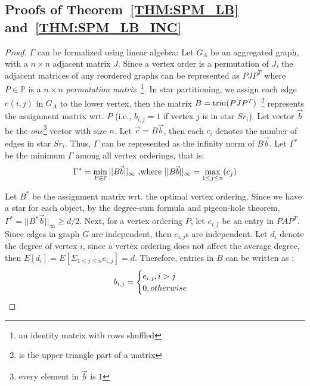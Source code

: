 \subsection{Proofs of Theorem~\ref{THM:SPM_LB} and~\ref{THM:SPM_LB_INC}}
\label{apx:thm2proof}

\begin{proof}
$\Gamma$ can be formalized using linear algebra:
Let $G_A$ be an aggregated graph, with a $n \times n$ adjacent matrix $J$.
Since a vertex order is a permutation of $J$, the adjacent matrices 
of any reordered graphs can be represented as $PJP^T$
where $P \in \mathbb{P}$ is a $n\times n$ \emph{permutation matrix}~\footnote{an identity matrix with rows shuffled}.
In star partitioning, we assign each edge $e(i,j)$ in $G_A$ to the lower vertex, 
then the matrix $B=\operatorname*{triu}(PJP^T)$~\footnote{ is the upper triangle part of a matrix}
represents the assignment matrix wrt. $P$ (i.e., $b_{i,j} = 1$ if vertex $j$ is in star $Sr_i$).
Let vector $\vec{b}$ be the \textit{one}\footnote{every element in $\vec{b}$ is $1$} 
vector with size $n$. Let $\vec{c} = B\vec{b}$, then each $c_i$ 
denotes the number of edges in star $Sr_i$. Thus, $\Gamma$ can be represented
as the infinity norm of $B\vec{b}$. Let $\Gamma^*$ be the minimum $\Gamma$ among all vertex orderings, that is:
\vspace{-2mm}
\begin{equation}
\vspace{-2mm}
\Gamma^* = \min_{P \in \mathbb{P}}{||B\vec{b}||_\infty} \text{ ,where } ||B\vec{b}||_\infty = \max_{1\leq j \leq n}(c_j)
\end{equation}

Let $B^*$ be the assignment matrix wrt. the optimal vertex ordering.
Since we have a star for each object, by the degree-sum formula and pigeon-hole theorem, 
$\Gamma^*=||B^*\vec{b}||_\infty \geq d/2$.
Next, for a vertex ordering $P$, let $e_{i,j}$ be an entry in $PAP^T$. Since 
edges in graph $G$ are independent, then $e_{i,j}$s are independent. 
Let $d_i$ denote the degree of vertex $i$, since a vertex ordering does not
affect the average degree,
then $E[d_i]=E[\Sigma_{1\leq j \leq n}e_{i,j}]=d$. Therefore, 
entries in $B$ can be written as :
\vspace{-2mm}
\begin{equation*}
\vspace{-1mm}
b_{i,j} = \begin{cases}
			e_{i,j}, i>j \\
			0, otherwise
		  \end{cases}  
\end{equation*}


\end{proof}
